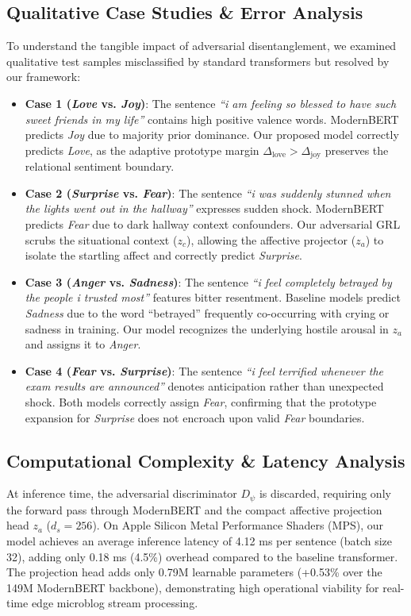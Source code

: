 \documentclass[journal,twocolumn]{article}
\begin{document}
\subsection{Qualitative Case Studies \& Error Analysis}
To understand the tangible impact of adversarial disentanglement, we examined qualitative test samples misclassified by standard transformers but resolved by our framework:
\begin{itemize}
    \item \textbf{Case 1 (\textit{Love} vs. \textit{Joy})}: The sentence \textit{``i am feeling so blessed to have such sweet friends in my life''} contains high positive valence words. ModernBERT predicts \textit{Joy} due to majority prior dominance. Our proposed model correctly predicts \textit{Love}, as the adaptive prototype margin $\Delta_{\text{love}} > \Delta_{\text{joy}}$ preserves the relational sentiment boundary.
    \item \textbf{Case 2 (\textit{Surprise} vs. \textit{Fear})}: The sentence \textit{``i was suddenly stunned when the lights went out in the hallway''} expresses sudden shock. ModernBERT predicts \textit{Fear} due to dark hallway context confounders. Our adversarial GRL scrubs the situational context ($z_c$), allowing the affective projector ($z_a$) to isolate the startling affect and correctly predict \textit{Surprise}.
    \item \textbf{Case 3 (\textit{Anger} vs. \textit{Sadness})}: The sentence \textit{``i feel completely betrayed by the people i trusted most''} features bitter resentment. Baseline models predict \textit{Sadness} due to the word ``betrayed'' frequently co-occurring with crying or sadness in training. Our model recognizes the underlying hostile arousal in $z_a$ and assigns it to \textit{Anger}.
    \item \textbf{Case 4 (\textit{Fear} vs. \textit{Surprise})}: The sentence \textit{``i feel terrified whenever the exam results are announced''} denotes anticipation rather than unexpected shock. Both models correctly assign \textit{Fear}, confirming that the prototype expansion for \textit{Surprise} does not encroach upon valid \textit{Fear} boundaries.
\end{itemize}

\subsection{Computational Complexity \& Latency Analysis}
At inference time, the adversarial discriminator $D_\psi$ is discarded, requiring only the forward pass through ModernBERT and the compact affective projection head $z_a$ ($d_s = 256$). On Apple Silicon Metal Performance Shaders (MPS), our model achieves an average inference latency of 4.12 ms per sentence (batch size 32), adding only 0.18 ms (4.5\%) overhead compared to the baseline transformer. The projection head adds only 0.79M learnable parameters (+0.53\% over the 149M ModernBERT backbone), demonstrating high operational viability for real-time edge microblog stream processing.
\end{document}

